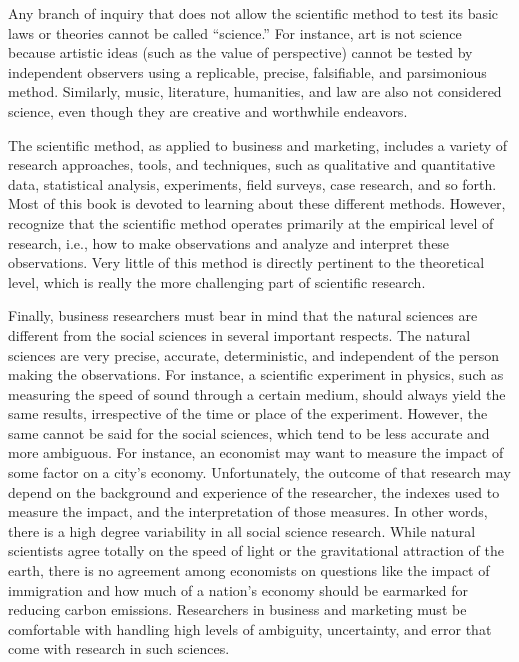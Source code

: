 Any branch of inquiry that does not allow the scientific method to test its basic laws or theories cannot be called ``science.'' For instance, art is not science because artistic ideas (such as the value of perspective) cannot be tested by independent observers using a replicable, precise, falsifiable, and parsimonious method. Similarly, music, literature, humanities, and law are also not considered science, even though they are creative and worthwhile endeavors.

The scientific method, as applied to business and marketing, includes a variety of research approaches, tools, and techniques, such as qualitative and quantitative data, statistical analysis, experiments, field surveys, case research, and so forth. Most of this book is devoted to learning about these different methods. However, recognize that the scientific method operates primarily at the empirical level of research, i.e., how to make observations and analyze and interpret these observations. Very little of this method is directly pertinent to the theoretical level, which is really the more challenging part of scientific research.

Finally, business researchers must bear in mind that the natural sciences are different from the social sciences in several important respects. The natural sciences are very precise, accurate, deterministic, and independent of the person making the observations. For instance, a scientific experiment in physics, such as measuring the speed of sound through a certain medium, should always yield the same results, irrespective of the time or place of the experiment. However, the same cannot be said for the social sciences, which tend to be less accurate and more ambiguous. For instance, an economist may want to measure the impact of some factor on a city's economy. Unfortunately, the outcome of that research may depend on the background and experience of the researcher, the indexes used to measure the impact, and the interpretation of those measures. In other words, there is a high degree variability in all social science research. While natural scientists agree totally on the speed of light or the gravitational attraction of the earth, there is no agreement among economists on questions like the impact of immigration and how much of a nation's economy should be earmarked for reducing carbon emissions. Researchers in business and marketing must be comfortable with handling high levels of ambiguity, uncertainty, and error that come with research in such sciences.

